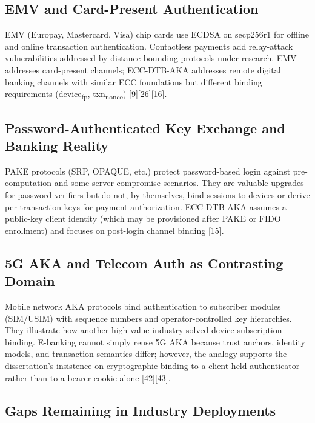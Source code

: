 \subsection{EMV and Card-Present Authentication}

\indent EMV (Europay, Mastercard, Visa) chip cards use ECDSA on secp256r1 for offline and online transaction authentication. Contactless payments add relay-attack vulnerabilities addressed by distance-bounding protocols under research. EMV addresses card-present channels; ECC-DTB-AKA addresses remote digital banking channels with similar ECC foundations but different binding requirements (device\textsubscript{fp}, txn\textsubscript{nonce}) \hyperref[ref:9]{[9]}\hyperref[ref:26]{[26]}\hyperref[ref:16]{[16]}.

\subsection{Password-Authenticated Key Exchange and Banking Reality}

\indent PAKE protocols (SRP, OPAQUE, etc.) protect password-based login against pre-computation and some server compromise scenarios. They are valuable upgrades for password verifiers but do not, by themselves, bind sessions to devices or derive per-transaction keys for payment authorization. ECC-DTB-AKA assumes a public-key client identity (which may be provisioned after PAKE or FIDO enrollment) and focuses on post-login channel binding \hyperref[ref:15]{[15]}.

\subsection{5G AKA and Telecom Auth as Contrasting Domain}

\indent Mobile network AKA protocols bind authentication to subscriber modules (SIM/USIM) with sequence numbers and operator-controlled key hierarchies. They illustrate how another high-value industry solved device-subscription binding. E-banking cannot simply reuse 5G AKA because trust anchors, identity models, and transaction semantics differ; however, the analogy supports the dissertation's insistence on cryptographic binding to a client-held authenticator rather than to a bearer cookie alone \hyperref[ref:42]{[42]}\hyperref[ref:43]{[43]}.

\subsection{Gaps Remaining in Industry Deployments}

